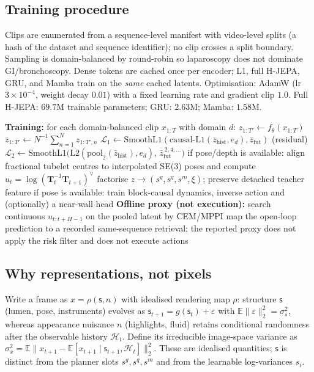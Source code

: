 \documentclass[preprint,12pt]{elsarticle}
\begin{document}
\subsection{Training procedure}
Clips are enumerated from a sequence-level manifest with video-level splits (a hash of the dataset and sequence identifier); no clip crosses a split boundary.
Sampling is domain-balanced by round-robin so laparoscopy does not dominate GI/bronchoscopy.
Dense tokens are cached once per encoder; L1, full H-JEPA, GRU, and Mamba train on the \emph{same} cached latents.
Optimisation: AdamW (lr $3{\times}10^{-4}$, weight decay $0.01$) with a fixed
learning rate and gradient clip $1.0$.
Full H-JEPA: $69.7$M trainable parameters; GRU: $2.63$M; Mamba: $1.58$M.

\begin{algorithm}[t]
\caption{Audited Endo-HJEPA training and grounded planning (no pixel loss).}
\label{alg:train}
\begin{algorithmic}[1]
\STATE \textbf{Training:} for each domain-balanced clip $x_{1:T}$ with domain $d$:
\STATE \quad $z_{1:T'}\leftarrow f_\theta(x_{1:T})$
\STATE \quad $\bar z_{1:T'}\leftarrow N^{-1}\sum_{n=1}^{N}z_{1:T',n}$
\STATE \quad $\mathcal{L}_1\leftarrow\mathrm{SmoothL1}(\mathrm{causal\text{-}L1}(\bar z_{\mathrm{hist}},e_d),\bar z_{\mathrm{fut}})$ \quad (residual)
\STATE \quad $\mathcal{L}_2\leftarrow\mathrm{SmoothL1}\!\bigl(\mathrm{L2}(\mathrm{pool}_2(\bar z_{\mathrm{hist}}),e_d),\,\bar z_{\mathrm{fut}}^{\,2,4,\ldots}\bigr)$
\STATE \quad if pose/depth is available: align fractional tubelet centres to interpolated SE(3) poses and compute $u_t=\log(\mathbf{T}_t^{-1}\mathbf{T}_{t+1})^\vee$
\STATE \quad factorise $z\to(s^g,s^q,s^m,\xi)$; preserve detached teacher feature
\STATE \quad if pose is available: train block-causal dynamics, inverse action and (optionally) a near-wall head
\STATE \textbf{Offline proxy (not execution):} search continuous $u_{t:t+H-1}$ on the pooled latent by CEM/MPPI
\STATE \quad map the open-loop prediction to a recorded same-sequence retrieval; the reported proxy does not apply the risk filter and does not execute actions
\end{algorithmic}
\end{algorithm}

\subsection{Why representations, not pixels}
\label{sec:theory}
Write a frame as $x=\rho(\mathsf{s},n)$ with idealised rendering map $\rho$:
structure $\mathsf{s}$ (lumen, pose,
instruments) evolves as
$\mathsf{s}_{t+1}=g(\mathsf{s}_t)+\varepsilon$ with
$\mathbb{E}\|\varepsilon\|_2^2=\sigma_s^2$, whereas appearance nuisance $n$
(highlights, fluid) retains conditional randomness after the observable
history $\mathcal H_t$. Define its irreducible image-space variance as
$\sigma_x^2=\mathbb{E}\|x_{t+1}-
\mathbb{E}[x_{t+1}\mid \mathsf{s}_{t+1},\mathcal H_t]\|_2^2$.
These are idealised quantities; $\mathsf{s}$ is distinct from the planner slots
$s^g,s^q,s^m$ and from the learnable log-variances $s_i$.
\end{document}
